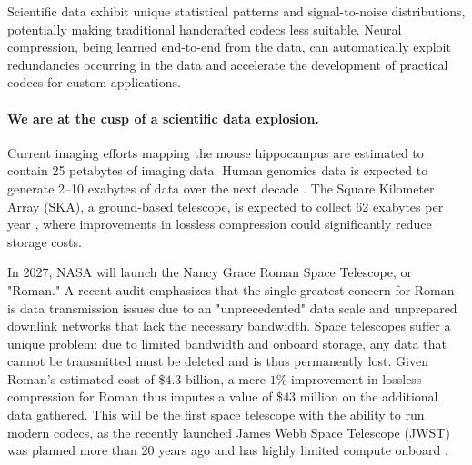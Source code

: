 Scientific data exhibit unique statistical patterns and signal-to-noise distributions, potentially making traditional handcrafted codecs less suitable. Neural compression, being learned end-to-end from the data, can automatically exploit redundancies occurring in the data and accelerate the development of practical codecs for custom applications.


\paragraph{We are at the cusp of a scientific data explosion.} Current imaging efforts mapping the mouse hippocampus \citep{neuralmapping2024} are estimated to contain 25 petabytes of imaging data. Human genomics data is expected to generate 2--10 exabytes of data over the next decade \citep{nih2024}. The Square Kilometer Array (SKA), a ground-based telescope, is expected to collect 62 exabytes per year \citep{2018Galax...6..120F}, where improvements in lossless compression could significantly reduce storage costs.

In 2027, NASA will launch the Nancy Grace Roman Space Telescope, or "Roman." A recent audit \citep{NASA_2024} emphasizes that the single greatest concern for Roman is data transmission issues due to an "unprecedented" data scale and unprepared downlink networks that lack the necessary bandwidth. Space telescopes suffer a unique problem: due to limited bandwidth and onboard storage, any data that cannot be transmitted must be deleted and is thus permanently lost. Given Roman's estimated cost of \$$4.3$ billion, a mere $1\%$ improvement in lossless compression for Roman thus imputes a value of \$$43$ million on the additional data gathered. This will be the first space telescope with the ability to run modern codecs, as the recently launched James Webb Space Telescope (JWST) was planned more than 20 years ago and has highly limited compute onboard \citep{2023PASP..135f8001G}.


